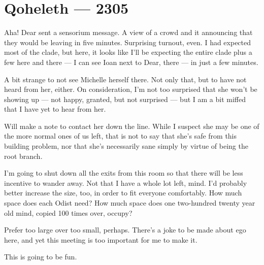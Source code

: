 \hypertarget{qoheleth-2305}{%
\chapter*{Qoheleth — 2305}\label{qoheleth-2305}}

Aha! Dear sent a sensorium message. A view of a crowd and it announcing that they would be leaving in five minutes. Surprising turnout, even. I had expected most of the clade, but here, it looks like I'll be expecting the entire clade plus a few here and there — I can see Ioan next to Dear, there — in just a few minutes.

A bit strange to not see Michelle herself there. Not only that, but to have not heard from her, either. On consideration, I'm not too surprised that she won't be showing up — not happy, granted, but not surprised — but I am a bit miffed that I have yet to hear from her.

Will make a note to contact her down the line. While I suspect she may be one of the more normal ones of us left, that is not to say that she's safe from this building problem, nor that she's necessarily sane simply by virtue of being the root branch.

I'm going to shut down all the exits from this room so that there will be less incentive to wander away. Not that I have a whole lot left, mind. I'd probably better increase the size, too, in order to fit everyone comfortably. How much space does each Odist need? How much space does one two-hundred twenty year old mind, copied 100 times over, occupy?

Prefer too large over too small, perhaps. There's a joke to be made about ego here, and yet this meeting is too important for me to make it.

This is going to be fun.
